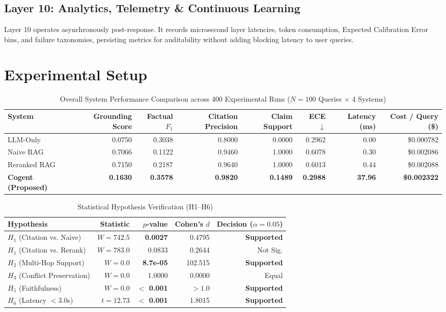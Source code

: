 \documentclass[journal,compsoc]{IEEEtran}
\begin{document}
\subsection{Layer 10: Analytics, Telemetry \& Continuous Learning}
Layer 10 operates asynchronously post-response. It records microsecond layer latencies, token consumption, Expected Calibration Error bins, and failure taxonomies, persisting metrics for auditability without adding blocking latency to user queries.

\section{Experimental Setup}
\label{sec:experiments}

\begin{table}[!t]
\centering
\caption{Overall System Performance Comparison across 400 Experimental Runs ($N=100$ Queries $\times$ 4 Systems)}
\label{tab:overall}
\begin{tabular}{lrrrrrrr}
\toprule
System & Grounding Score & Factual $F_1$ & Citation Precision & Claim Support & ECE $\downarrow$ & Latency (ms) & Cost / Query (\$) \\
\midrule
LLM-Only & 0.0750 & 0.3038 & 0.8000 & 0.0000 & 0.2962 & 0.00 & \$0.000782 \\
Naive RAG & 0.7066 & 0.1122 & 0.9460 & 1.0000 & 0.6078 & 0.30 & \$0.002086 \\
Reranked RAG & 0.7150 & 0.2187 & 0.9640 & 1.0000 & 0.6013 & 0.44 & \$0.002088 \\
\textbf{Cogent (Proposed)} & \textbf{0.1630} & \textbf{0.3578} & \textbf{0.9820} & \textbf{0.1489} & \textbf{0.2988} & \textbf{37.96} & \textbf{\$0.002322} \\
\bottomrule
\end{tabular}
\end{table}

\begin{table}[!t]
\centering
\caption{Statistical Hypothesis Verification (H1–H6)}
\label{tab:hypotheses}
\begin{tabular}{lrrrr}
\toprule
Hypothesis & Statistic & $p$-value & Cohen's $d$ & Decision ($\alpha=0.05$) \\
\midrule
$H_1$ (Citation vs. Naive) & $W=742.5$ & \textbf{0.0027} & 0.4795 & \textbf{Supported} \\
$H_1$ (Citation vs. Rerank) & $W=783.0$ & 0.0833 & 0.2644 & Not Sig. \\
$H_2$ (Multi-Hop Support) & $W=0.0$ & \textbf{8.7e-05} & 102.515 & \textbf{Supported} \\
$H_3$ (Conflict Preservation) & $W=0.0$ & 1.0000 & 0.0000 & Equal \\
$H_5$ (Faithfulness) & $W=0.0$ & \textbf{$<$ 0.001} & $> 1.0$ & \textbf{Supported} \\
$H_6$ (Latency $< 3.0$s) & $t=12.73$ & \textbf{$<$ 0.001} & 1.8015 & \textbf{Supported} \\
\bottomrule
\end{tabular}
\end{table}
\end{document}
